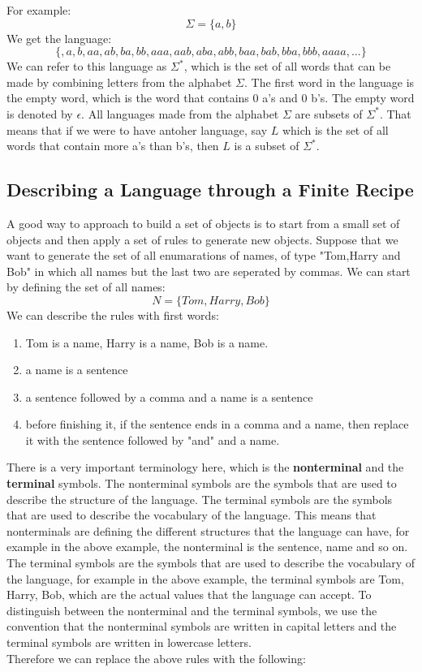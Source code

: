 For example: 
$$ \Sigma = \{a,b\} $$
We get the language: 
$$ \{ ,a,b,aa,ab,ba,bb,aaa,aab,aba,abb,baa,bab,bba,bbb,aaaa,...\} $$
We can refer to this language as $\Sigma^*$, which is the set of all words that can be made by combining letters from the alphabet $\Sigma$.
The first word in the language is the empty word, which is the word that contains 0 a's and 0 b's. The empty word is denoted by $\epsilon$.
All languages made from the alphabet $\Sigma$ are subsets of $\Sigma^*$. That means that if we were to have antoher language, say $L$ which is the set of all words that contain more a's than b's, then $L$ is a subset of $\Sigma^*$.

\subsection{Describing a Language through a Finite Recipe}
A good way to approach to build a set of objects is to start from a small set of objects and then apply a set of rules to generate new objects.
Suppose that we want to generate the set of all enumarations of names, of type "Tom,Harry and Bob" in which all names but the last two are seperated by commas.
We can start by defining the set of all names:
$$ N = \{Tom,Harry,Bob\} $$
We can describe the rules with first words: 
\begin{enumerate}
    \item Tom is a name, Harry is a name, Bob is a name.
    \item a name is a sentence
    \item a sentence followed by a comma and a name is a sentence
    \item before finishing it, if the sentence ends in a comma and a name, then replace it with the sentence followed by "and" and a name.
\end{enumerate}

There is a very important terminology here, which is the \textbf{nonterminal} and the \textbf{terminal} symbols.
The nonterminal symbols are the symbols that are used to describe the structure of the language. The terminal symbols are the symbols that are used to describe the vocabulary of the language.
This means that nonterminals are defining the different structures that the language can have, for example in the above example, the nonterminal is the sentence, name and so on. 
The terminal symbols are the symbols that are used to describe the vocabulary of the language, for example in the above example, the terminal symbols are Tom, Harry, Bob, which are the actual values that the language can accept. 
To distinguish between the nonterminal and the terminal symbols, we use the convention that the nonterminal symbols are written in capital letters and the terminal symbols are written in lowercase letters. \\
Therefore we can replace the above rules with the following:

